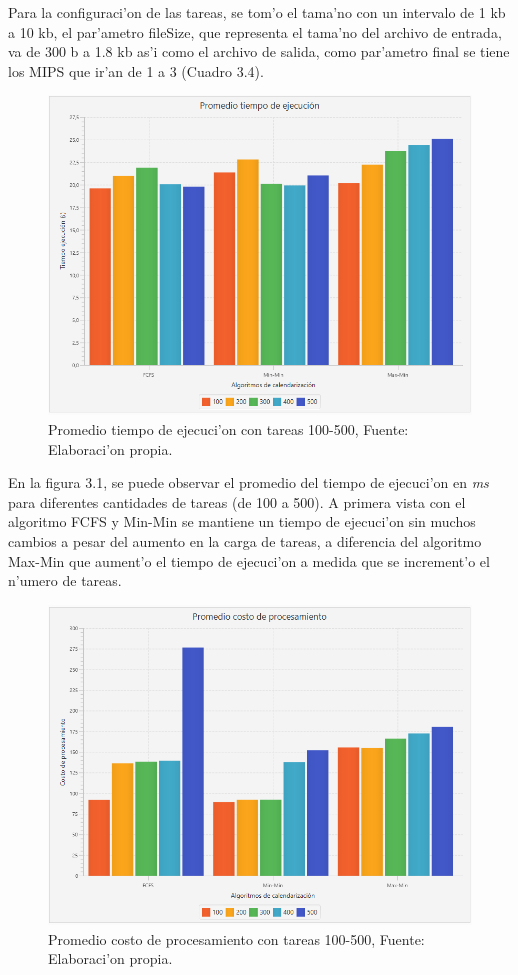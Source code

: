 Para la configuraci'on de las tareas, se tom'o el tama'no con un intervalo de 1 kb a 10 kb,  el par'ametro fileSize, que representa el tama'no del archivo de entrada, va de 300 b a 1.8 kb as'i como el archivo de salida, como par'ametro final se tiene los MIPS que ir'an de 1 a 3 (Cuadro 3.4).





\begin{figure}[H] 
	\caption{Promedio tiempo de ejecuci'on con tareas 100-500, Fuente: Elaboraci'on propia.}
	\centering
	\includegraphics[scale=0.5]{media/tiempoejecucion}
\end{figure}

En la figura 3.1, se puede observar el promedio del tiempo de ejecuci'on en \emph{ms} para diferentes cantidades de tareas (de 100 a 500). A primera vista con el algoritmo FCFS y Min-Min se mantiene un tiempo de ejecuci'on sin muchos cambios a pesar del aumento en la carga de tareas, a diferencia del algoritmo Max-Min que aument'o el tiempo de ejecuci'on a medida que se increment'o el n'umero de tareas.

\begin{figure}[H] 
	\caption{Promedio costo de procesamiento con tareas 100-500, Fuente: Elaboraci'on propia.}
	\centering
	\includegraphics[scale=0.5]{media/costoproce}
\end{figure}


